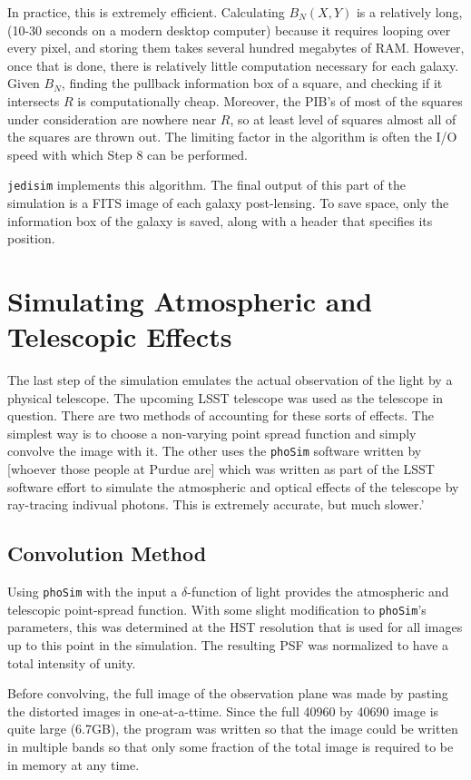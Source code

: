 \documentclass[10pt,twoside]{article}
\theoremstyle{definition}
\theoremstyle{exercise}
\begin{document}
In practice, this is extremely efficient. Calculating $B_N(X,Y)$ is a relatively long, (10-30 seconds on a modern desktop computer) because it requires looping over every pixel, and storing them takes several hundred megabytes of RAM. However, once that is done, there is relatively little computation necessary for each galaxy. Given $B_N$, finding the pullback information box of a square, and checking if it intersects $R$ is computationally cheap. Moreover, the PIB's of most of the squares under consideration are nowhere near $R$, so at least level of squares almost all of the squares are thrown out. The limiting factor in the algorithm is often the I/O speed with which Step 8 can be performed.

\texttt{jedisim} implements this algorithm. The final output of this part of the simulation is a FITS image of each galaxy post-lensing. To save space, only the information box of the galaxy is saved, along with a header that specifies its position.

\section{Simulating Atmospheric and Telescopic Effects}
\label{sec:atmospherics}
The last step of the simulation emulates the actual observation of the light by a physical telescope. The upcoming LSST telescope was used as the telescope in question. There are two methods of accounting for these sorts of effects. The simplest way is to choose a non-varying point spread function and simply convolve the image with it. The other uses the \texttt{phoSim} software written by [whoever those people at Purdue are] which was written as part of the LSST software effort to simulate the atmospheric and optical effects of the telescope by ray-tracing indivual photons. This is extremely accurate, but much slower.'

\subsection{Convolution Method}
Using \texttt{phoSim} with the input a $\delta$-function of light provides the atmospheric and telescopic point-spread function. With some slight modification to \texttt{phoSim}'s parameters, this was determined at the HST resolution that is used for all images up to this point in the simulation. The resulting PSF was normalized to have a total intensity of unity.

Before convolving, the full image of the observation plane was made by pasting the distorted images in one-at-a-ttime. Since the full 40960 by 40690 image is quite large (6.7GB), the program was written so that the image could be written in multiple bands so that only some fraction of the total image is required to be in memory at any time.
\end{document}
